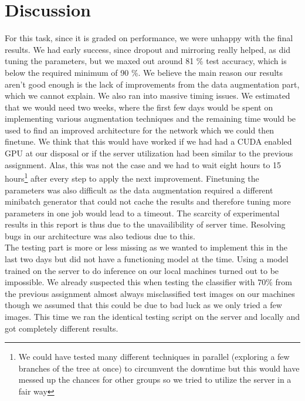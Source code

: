 \section{Discussion}
For this task, since it is graded on performance, we were unhappy with the final results. We had early success, since dropout and mirroring really helped, as did tuning the parameters, but we maxed out around 81 \% test accuracy, which is below the required minimum of 90 \%. We believe the main reason our results aren't good enough is the lack of improvements from the data augmentation part, which we cannot explain. We also ran into massive timing issues. We estimated that we would need two weeks, where the first few days would be spent on implementing various augmentation techniques and the remaining time would be used to find an improved architecture for the network which we could then finetune. We think that this would have worked if we had had a CUDA enabled GPU at our disposal or if the server utilization had been similar to the previous assignment. Alas, this was not the case and we had to wait eight hours to 15 hours\footnote{We could have tested many different techniques in parallel (exploring a few branches of the tree at once) to circumvent the downtime but this would have messed up the chances for other groups so we tried to utilize the server in a fair way} after every step to apply the next improvement. Finetuning the parameters was also difficult as the data augmentation required a different minibatch generator that could not cache the results and therefore tuning more parameters in one job would lead to a timeout. The scarcity of experimental results in this report is thus due to the unavailibility of server time. Resolving bugs in our architecture was also tedious due to this. 
\\
The testing part is more or less missing as we wanted to implement this in the last two days but did not have a functioning model at the time. Using a model trained on the server to do inference on our local machines turned out to be impossible. We already suspected this when testing the classifier with $70\%$ from the previous assignment almost always misclassified test images on our machines though we assumed that this could be due to bad luck as we only tried a few images. This time we ran the identical testing script on the server and locally and got completely different results.  

